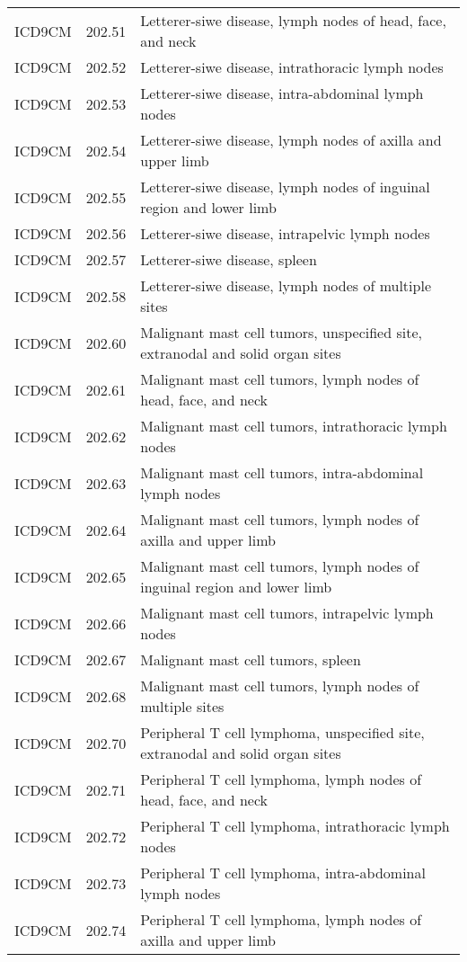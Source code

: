 \begin{longtable}{p{}p{}p{}}
  ICD9CM & 202.51 & Letterer-siwe disease, lymph nodes of head, face, and neck \\ 
  ICD9CM & 202.52 & Letterer-siwe disease, intrathoracic lymph nodes \\ 
  ICD9CM & 202.53 & Letterer-siwe disease, intra-abdominal lymph nodes \\ 
  ICD9CM & 202.54 & Letterer-siwe disease, lymph nodes of axilla and upper limb \\ 
  ICD9CM & 202.55 & Letterer-siwe disease, lymph nodes of inguinal region and lower limb \\ 
  ICD9CM & 202.56 & Letterer-siwe disease, intrapelvic lymph nodes \\ 
  ICD9CM & 202.57 & Letterer-siwe disease, spleen \\ 
  ICD9CM & 202.58 & Letterer-siwe disease, lymph nodes of multiple sites \\ 
  ICD9CM & 202.60 & Malignant mast cell tumors, unspecified site, extranodal and solid organ sites \\ 
  ICD9CM & 202.61 & Malignant mast cell tumors, lymph nodes of head, face, and neck \\ 
  ICD9CM & 202.62 & Malignant mast cell tumors, intrathoracic lymph nodes \\ 
  ICD9CM & 202.63 & Malignant mast cell tumors, intra-abdominal lymph nodes \\ 
  ICD9CM & 202.64 & Malignant mast cell tumors, lymph nodes of axilla and upper limb \\ 
  ICD9CM & 202.65 & Malignant mast cell tumors, lymph nodes of inguinal region and lower limb \\ 
  ICD9CM & 202.66 & Malignant mast cell tumors, intrapelvic lymph nodes \\ 
  ICD9CM & 202.67 & Malignant mast cell tumors, spleen \\ 
  ICD9CM & 202.68 & Malignant mast cell tumors, lymph nodes of multiple sites \\ 
  ICD9CM & 202.70 & Peripheral T cell lymphoma, unspecified site, extranodal and solid organ sites \\ 
  ICD9CM & 202.71 & Peripheral T cell lymphoma, lymph nodes of head, face, and neck \\ 
  ICD9CM & 202.72 & Peripheral T cell lymphoma, intrathoracic lymph nodes \\ 
  ICD9CM & 202.73 & Peripheral T cell lymphoma, intra-abdominal lymph nodes \\ 
  ICD9CM & 202.74 & Peripheral T cell lymphoma, lymph nodes of axilla and upper limb \\ 

\end{longtable}
